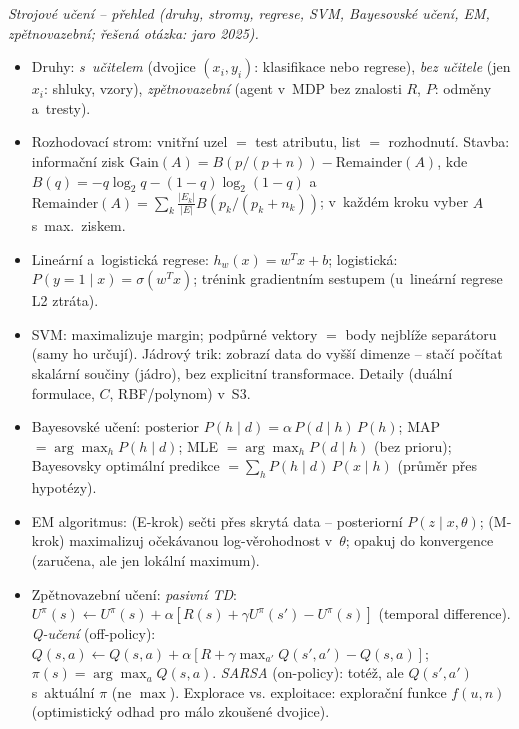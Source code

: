 \begin{poznamka}
\smallskip
\emph{Strojové učení -- přehled (druhy, stromy, regrese, SVM, Bayesovské učení, EM, zpětnovazební; řešená otázka: jaro 2025).}
\begin{itemize}
  \item Druhy: \emph{s~učitelem} (dvojice $(x_i,y_i)$: klasifikace nebo regrese), \emph{bez učitele} (jen $x_i$: shluky, vzory), \emph{zpětnovazební} (agent v~MDP bez znalosti $R$, $P$: odměny a~tresty).
  \item Rozhodovací strom: vnitřní uzel $=$ test atributu, list $=$ rozhodnutí. Stavba: informační zisk $\mathrm{Gain}(A)=B(p/(p+n))-\mathrm{Remainder}(A)$, kde $B(q)=-q\log_2 q-(1-q)\log_2(1-q)$ a~$\mathrm{Remainder}(A)=\sum_k\tfrac{|E_k|}{|E|}B(p_k/(p_k+n_k))$; v~každém kroku vyber $A$ s~max.\ ziskem.
  \item Lineární a~logistická regrese: $h_w(x)=w^Tx+b$; logistická: $P(y{=}1\mid x)=\sigma(w^Tx)$; trénink gradientním sestupem (u~lineární regrese L2 ztráta).
  \item SVM: maximalizuje margin; podpůrné vektory $=$ body nejblíže separátoru (samy ho určují). Jádrový trik: zobrazí data do vyšší dimenze -- stačí počítat skalární součiny (jádro), bez explicitní transformace. Detaily (duální formulace, $C$, RBF/polynom) v~S3.
  \item Bayesovské učení: posterior $P(h\mid d)=\alpha\,P(d\mid h)\,P(h)$; MAP $=\arg\max_h P(h\mid d)$; MLE $=\arg\max_h P(d\mid h)$ (bez prioru); Bayesovsky optimální predikce $=\sum_h P(h\mid d)\,P(x\mid h)$ (průměr přes hypotézy).
  \item EM algoritmus: (E-krok) sečti přes skrytá data -- posteriorní $P(z\mid x,\theta)$; (M-krok) maximalizuj očekávanou log-věrohodnost v~$\theta$; opakuj do konvergence (zaručena, ale jen lokální maximum).
  \item Zpětnovazební učení: \emph{pasivní TD}: $U^\pi(s)\leftarrow U^\pi(s)+\alpha[R(s)+\gamma U^\pi(s')-U^\pi(s)]$ (temporal difference). \emph{Q-učení} (off-policy): $Q(s,a)\leftarrow Q(s,a)+\alpha[R+\gamma\max_{a'}Q(s',a')-Q(s,a)]$; $\pi(s)=\arg\max_a Q(s,a)$. \emph{SARSA} (on-policy): totéž, ale $Q(s',a')$ s~aktuální $\pi$ (ne $\max$). Explorace vs. exploitace: explorační funkce $f(u,n)$ (optimistický odhad pro málo zkoušené dvojice).
\end{itemize}
\end{poznamka}
